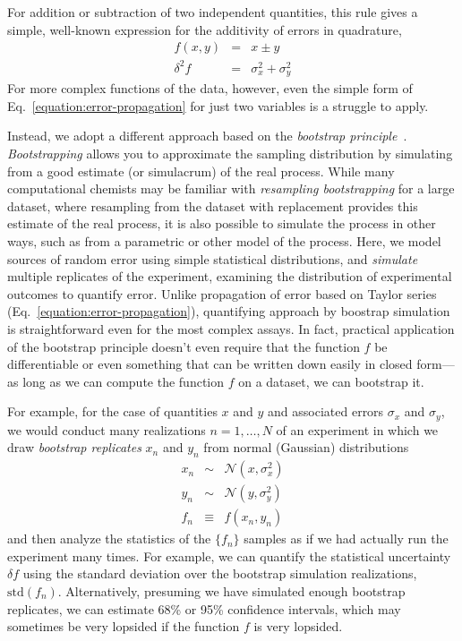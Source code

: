 \documentclass[aps,pre,twocolumn,nofootinbib,superscriptaddress,linenumbers]{revtex4-1}
\begin{document}
For addition or subtraction of two independent quantities, this rule gives a simple, well-known expression for the additivity of errors in quadrature,
\begin{eqnarray}
f(x,y) &=& x \pm y \nonumber \\
\delta^2 f &=& \sigma^2_x + \sigma^2_y 
\end{eqnarray}
For more complex functions of the data, however, even the simple form of Eq.~\ref{equation:error-propagation} for just two variables is a struggle to apply.

Instead, we adopt a different approach based on the \emph{bootstrap principle}~\cite{shalizi_simple_????}.
\emph{Bootstrapping} allows you to approximate the sampling distribution by simulating from a good estimate (or simulacrum) of the real process.
While many computational chemists may be familiar with \emph{resampling bootstrapping} for a large dataset, where resampling from the dataset with replacement provides this estimate of the real process, it is also possible to simulate the process in other ways, such as from a parametric or other model of the process.
Here, we model sources of random error using simple statistical distributions, and \emph{simulate} multiple replicates of the experiment, examining the distribution of experimental outcomes to quantify error.
Unlike propagation of error based on Taylor series (Eq.~\ref{equation:error-propagation}), quantifying approach by boostrap simulation is straightforward even for the most complex assays.
In fact, practical application of the bootstrap principle doesn't even require that the function $f$ be differentiable or even something that can be written down easily in closed form---as long as we can compute the function $f$ on a dataset, we can bootstrap it.

For example, for the case of  quantities $x$ and $y$ and associated errors $\sigma_x$ and $\sigma_y$, we would conduct many realizations $n = 1, \ldots, N$ of an experiment in which we draw \emph{bootstrap replicates} $x_n$ and $y_n$ from normal (Gaussian) distributions
\begin{eqnarray}
x_n &\sim& \mathcal{N}(x, \sigma^2_x) \nonumber \\
y_n &\sim& \mathcal{N}(y, \sigma^2_y) \nonumber \\
f_n &\equiv& f(x_n, y_n)
\end{eqnarray}
and then analyze the statistics of the $\{f_n\}$ samples as if we had actually run the experiment many times.
For example, we can quantify the statistical uncertainty $\delta f$ using the standard deviation over the bootstrap simulation realizations, $\mathrm{std}(f_n)$.
Alternatively, presuming we have simulated enough bootstrap replicates, we can estimate 68\% or 95\% confidence intervals, which may sometimes be very lopsided if the function $f$ is very lopsided.
\end{document}
